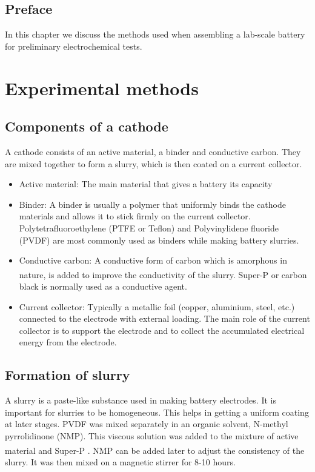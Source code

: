 \section*{Preface}
In this chapter we discuss the methods used when assembling a lab-scale battery for preliminary electrochemical tests. 
\pagebreak
\chapter{Experimental methods} %

\label{chap3} %

\section{Components of a cathode}
A cathode consists of an active material, a binder and conductive carbon. They are mixed together to form a slurry, which is then coated on a current collector.  
\begin{itemize}
    \item Active material: The main material that gives a battery its capacity
    \item Binder: A binder is usually a polymer that uniformly binds the cathode materials and allows it to stick firmly on the current collector. Polytetrafluoroethylene (PTFE or Teflon) and Polyvinylidene fluoride (PVDF) are most commonly used as binders while making battery slurries.
    \item Conductive carbon: A conductive form of carbon which is amorphous in nature, is added to improve the conductivity of the slurry. Super-P\textsuperscript{\textregistered} or carbon black is normally used as a conductive agent. 
    \item Current collector: Typically a metallic foil (copper, aluminium, steel, etc.) connected to the electrode with external loading. The main role of the current collector is to support the electrode and to collect the accumulated electrical energy from the electrode\cite{sun_effect_2017}.
\end{itemize}

\section{Formation of slurry}
A slurry is a paste-like substance used in making battery electrodes. It is important for slurries to be homogeneous. This helps in getting a uniform coating at later stages.  PVDF was mixed separately in an organic solvent, N-methyl pyrrolidinone (NMP). This viscous solution was added to the mixture of active material and Super-P\textsuperscript{\textregistered} . NMP can be added later to adjust the consistency of the slurry. It was then mixed on a magnetic stirrer for 8-10 hours. 

